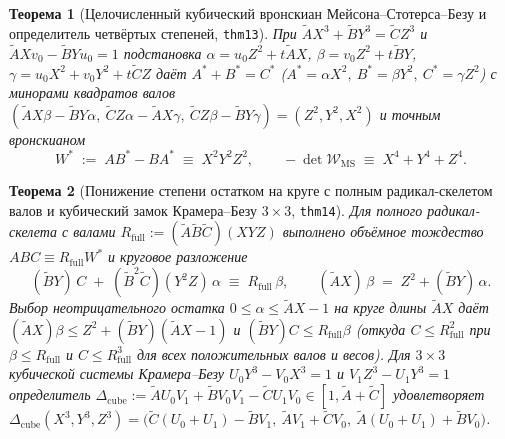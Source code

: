 \documentclass[11pt,a4paper]{article}
\theoremstyle{plain}
\newtheorem{theorem}{Теорема}[section]
\theoremstyle{definition}
\begin{document}
\begin{theorem}[Целочисленный кубический вронскиан Мейсона--Стотерса--Безу и определитель четвёртых степеней, \texttt{thm13}]
\label{thm:mason-stothers-thm13}
При $\widetilde{A}X^3 + \widetilde{B}Y^3 = \widetilde{C}Z^3$ и $\widetilde{A}Xv_0 - \widetilde{B}Yu_0 = 1$ подстановка $\alpha = u_0 Z^2 + t\widetilde{A}X$, $\beta = v_0 Z^2 + t\widetilde{B}Y$, $\gamma = u_0 X^2 + v_0 Y^2 + t\widetilde{C}Z$ даёт $A^*+B^*=C^*$ ($A^*=\alpha X^2,\ B^*=\beta Y^2,\ C^*=\gamma Z^2$) с минорами квадратов валов $(\widetilde{A}X\beta-\widetilde{B}Y\alpha,\ \widetilde{C}Z\alpha-\widetilde{A}X\gamma,\ \widetilde{C}Z\beta-\widetilde{B}Y\gamma) = (Z^2,Y^2,X^2)$ и точным вронскианом
\begin{equation}
  \label{eq:ms-wronskian}
  W^* \;:=\; A B^* - B A^* \;\equiv\; X^2 Y^2 Z^2,\qquad
  -\det\mathcal{W}_{\mathrm{MS}} \;\equiv\; X^4 + Y^4 + Z^4.
\end{equation}
\end{theorem}

\begin{theorem}[Понижение степени остатком на круге с полным радикал-скелетом валов и кубический замок Крамера--Безу $3\times 3$, \texttt{thm14}]
\label{thm:circle-remainder-thm14}
Для полного радикал-скелета с валами $R_{\mathrm{full}} := (\widetilde{A}\widetilde{B}\widetilde{C})(X Y Z)$ выполнено объёмное тождество $A B C \equiv R_{\mathrm{full}} W^*$ и круговое разложение
\begin{equation}
  \label{eq:circle-remainder-rfull}
  (\widetilde{B}Y)\,C \;+\; (\widetilde{B}^2\widetilde{C})(Y^2 Z)\,\alpha \;\equiv\; R_{\mathrm{full}}\,\beta,\qquad
  (\widetilde{A}X)\,\beta \;=\; Z^2 + (\widetilde{B}Y)\,\alpha.
\end{equation}
Выбор неотрицательного остатка $0\le\alpha\le\widetilde{A}X-1$ на круге длины $\widetilde{A}X$ даёт $(\widetilde{A}X)\beta \le Z^2 + (\widetilde{B}Y)(\widetilde{A}X-1)$ и $(\widetilde{B}Y)C \le R_{\mathrm{full}}\beta$ (откуда $C \le R_{\mathrm{full}}^2$ при $\beta\le R_{\mathrm{full}}$ и $C \le R_{\mathrm{full}}^3$ для всех положительных валов и весов). Для $3\times 3$ кубической системы Крамера--Безу $U_0 Y^3 - V_0 X^3 = 1$ и $V_1 Z^3 - U_1 Y^3 = 1$ определитель $\Delta_{\mathrm{cube}} := \widetilde{A}U_0 V_1 + \widetilde{B}V_0 V_1 - \widetilde{C}U_1 V_0 \in [1, \widetilde{A}+\widetilde{C}]$ удовлетворяет $\Delta_{\mathrm{cube}}(X^3, Y^3, Z^3) = \bigl(\widetilde{C}(U_0+U_1)-\widetilde{B}V_1,\ \widetilde{A}V_1+\widetilde{C}V_0,\ \widetilde{A}(U_0+U_1)+\widetilde{B}V_0\bigr)$.
\end{theorem}
\end{document}
